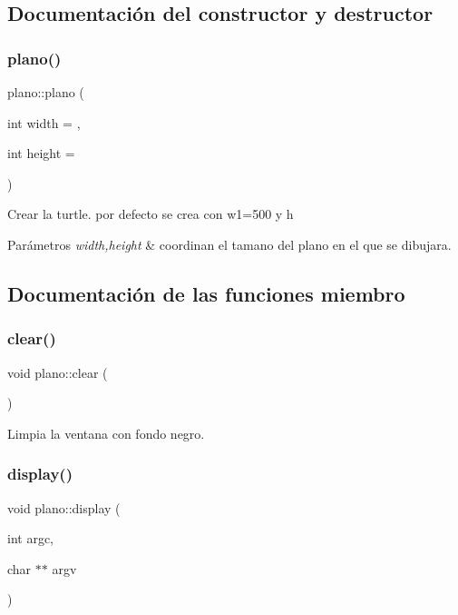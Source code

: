 \subsection{Documentación del constructor y destructor}
\mbox{\label{classplano_a07a6173550219cbe2d32925afac542a5}} 
\subsubsection{\texorpdfstring{plano()}{plano()}}
{\footnotesize\ttfamily plano\+::plano (\begin{DoxyParamCaption}\item[{int}]{width = {},  }\item[{int}]{height = {} }\end{DoxyParamCaption})}

Crear la turtle. por defecto se crea con w1=500 y h 
\begin{DoxyParams}{Parámetros}
{\em width,height} & coordinan el tamano del plano en el que se dibujara. \\
\hline
\end{DoxyParams}


\subsection{Documentación de las funciones miembro}
\mbox{\label{classplano_af182fef3457cdab6f0b64b41d98b4edf}} 
\subsubsection{\texorpdfstring{clear()}{clear()}}
{\footnotesize\ttfamily void plano\+::clear (\begin{DoxyParamCaption}{ }\end{DoxyParamCaption})}

Limpia la ventana con fondo negro. \mbox{\label{classplano_aa17e44a9925d265425e883f3bd8c1565}} 
\subsubsection{\texorpdfstring{display()}{display()}}
{\footnotesize\ttfamily void plano\+::display (\begin{DoxyParamCaption}\item[{int}]{argc,  }\item[{char $\ast$$\ast$}]{argv }\end{DoxyParamCaption})}

